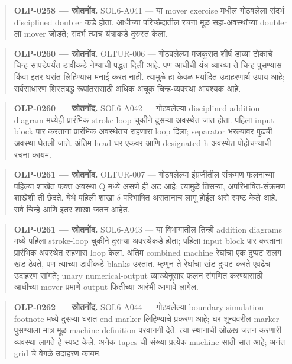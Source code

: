 \begin{quote}\small\textbf{OLP-0258 — स्रोतनोंद.} SOL6-A041 — या mover exercise मधील गोठवलेला संदर्भ disciplined doubler कडे होता. आधीच्या परिच्छेदातील रचना मूळ सहा-अवस्थांच्या doubler ला mover जोडते; संदर्भ त्याच यंत्राकडे दुरुस्त केला.\end{quote}
\begin{quote}\small\textbf{OLP-0260 — स्रोतनोंद.} OLTUR-006 — गोठवलेल्या मजकुरात शीर्ष डाव्या टोकाचे चिन्ह सापडेपर्यंत डावीकडे नेण्याची पद्धत दिली आहे. पण आधीची यंत्र-व्याख्या ते चिन्ह पुसण्यास किंवा इतर घरांत लिहिण्यास मनाई करत नाही. त्यामुळे हा केवळ मर्यादित उदाहरणार्थ उपाय आहे; सर्वसाधारण शिस्तबद्ध रूपांतरासाठी अधिक अचूक चिन्ह-व्यवस्था आवश्यक आहे.\end{quote}
\begin{quote}\small\textbf{OLP-0260 — स्रोतनोंद.} SOL6-A042 — गोठवलेल्या disciplined addition diagram मध्येही प्रारंभिक stroke-loop चुकीने दुसऱ्या अवस्थेत जात होता. पहिला input block पार करताना प्रारंभिक अवस्थेतच राहणारा loop दिला; separator भरल्यावर पुढची अवस्था घेतली जाते. अंतिम head घर एकवर आणि designated h अवस्थेत पोहोचण्याची रचना कायम.\end{quote}
\begin{quote}\small\textbf{OLP-0261 — स्रोतनोंद.} OLTUR-007 — गोठवलेल्या इंग्रजीतील संक्रमण फलनाच्या पहिल्या शाखेत फक्त अवस्था Q मध्ये असणे ही अट आहे; त्यामुळे तिसऱ्या, अपरिभाषित-संक्रमण शाखेशी ती छेदते. येथे पहिली शाखा \ensuremath{\delta} परिभाषित असतानाच लागू होईल असे स्पष्ट केले आहे. सर्व चिन्हे आणि इतर शाखा जतन आहेत.\end{quote}
\begin{quote}\small\textbf{OLP-0261 — स्रोतनोंद.} SOL6-A043 — या विभागातील तिन्ही addition diagrams मध्ये पहिला stroke-loop चुकीने दुसऱ्या अवस्थेकडे होता; पहिला input block पार करताना प्रारंभिक अवस्थेत राहणारा loop केला. अंतिम combined machine रेघांचा एक दुप्पट सलग खंड ठेवते, पण त्याच्या डावीकडे blanks उरतात. म्हणून ते रेघांचा खंड दुप्पट करते एवढेच उदाहरण सांगते; unary numerical-output व्याख्येनुसार फलन संगणित करण्यासाठी आधीच्या mover प्रमाणे output फितीच्या आरंभी आणावे लागेल.\end{quote}
\begin{quote}\small\textbf{OLP-0262 — स्रोतनोंद.} SOL6-A044 — गोठवलेल्या boundary-simulation footnote मध्ये दुसऱ्या घरात end-marker लिहिण्याचे प्रकरण आहे; घर शून्यवरील marker पुसण्याला मात्र मूळ machine definition परवानगी देते. त्या स्थानाची ओळख जतन करणारी व्यवस्था लागते हे स्पष्ट केले. अनेक tapes ची संख्या प्रत्येक machine साठी सांत आहे; अनंत grid चे वेगळे उदाहरण कायम.\end{quote}

